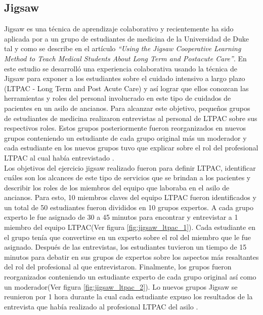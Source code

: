 \subsection{Jigsaw}
Jigsaw es una técnica de aprendizaje colaborativo y recientemente ha sido aplicada por  a un grupo de estudiantes de medicina  de la Universidad de Duke tal y como se describe en el artículo \emph{``Using the Jigsaw Cooperative Learning Method to Teach Medical Students About Long Term and Postacute Care''}. En este estudio se desarrolló una experiencia colaborativa usando la técnica de Jigsaw para exponer a los estudiantes sobre el cuidado intensivo a largo plazo  (LTPAC - Long Term and Post Acute Care) y así lograr que ellos conozcan las herramientas y roles del personal involucrado en este tipo de cuidados de pacientes en un asilo de ancianos. Para alcanzar este objetivo, pequeños grupos de estudiantes de medicina realizaron entrevistas al personal de LTPAC sobre sus respectivos roles. Estos grupos posteriormente fueron reorganizados en nuevos grupos conteniendo un estudiante de cada grupo original más un moderador y cada estudiante en los nuevos grupos tuvo que explicar sobre el rol del profesional LTPAC al cual había entrevistado \cite{Buhr2014429}.\\

Los objetivos del ejercicio jigsaw realizado fueron para definir LTPAC, identificar cuáles son los alcances de este tipo de servicios que se brindan a los pacientes y describir los roles de los miembros del equipo que laboraba en el asilo de ancianos. Para esto, 10 miembros claves del equipo LTPAC fueron identificados y un total de 50 estudiantes fueron divididos en 10 grupos expertos. A cada grupo experto le fue asignado de 30 a 45 minutos para encontrar y entrevistar a 1 miembro del equipo LTPAC(Ver figura \ref{fig:jigsaw_ltpac_1}). Cada estudiante en el grupo tenía que convertirse en un experto sobre el rol del miembro que le fue asignado. Después de las entrevistas, los estudiantes tuvieron un tiempo de 15 minutos para debatir en sus grupos de expertos sobre los aspectos más resaltantes del rol del profesional al que entrevistaron. Finalmente, los grupos fueron reorganizados conteniendo un estudiante experto de cada grupo original así como un moderador(Ver figura \ref{fig:jigsaw_ltpac_2}). Lo nuevos grupos Jigsaw se reunieron por 1 hora durante la cual cada estudiante expuso los resultados de la entrevista que había realizado al profesional LTPAC del asilo \cite{Buhr2014429}.\\



